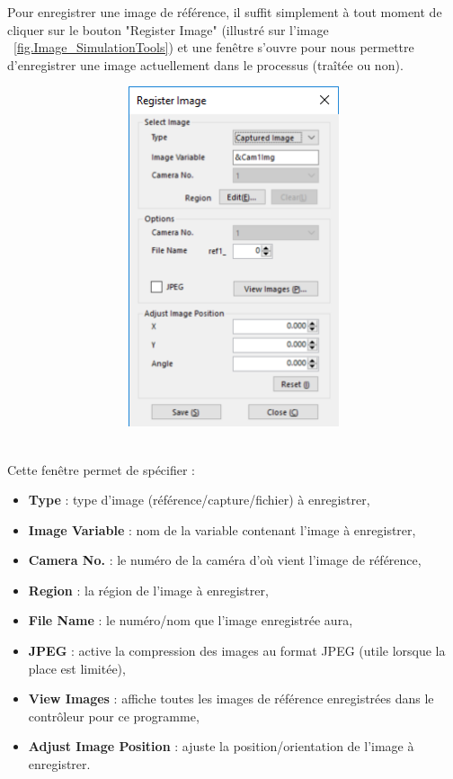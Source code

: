 Pour enregistrer une image de référence, il suffit simplement à tout moment de cliquer sur le bouton "Register Image" (illustré sur l'image ~\ref{fig.Image_SimulationTools}) et une fenêtre s’ouvre pour nous permettre d’enregistrer une image actuellement dans le processus (traîtée ou non). 

\noindent
\begin{minipage}[c]{\textwidth}
  \centering
  \includegraphics[width=16cm, height=10cm, keepaspectratio]{addOns/registerImage.png}
  \label{fig.Image_RefImagesSaves}
\end{minipage}\\

Cette fenêtre permet de spécifier :
\begin{itemize}
  \item \textbf{Type} : type d’image (référence/capture/fichier) à enregistrer,
  \item \textbf{Image Variable} : nom de la variable contenant l’image à enregistrer,
  \item \textbf{Camera No.} : le numéro de la caméra d’où vient l’image de référence,
  \item \textbf{Region} : la région de l’image à enregistrer,
  \item \textbf{File Name} : le numéro/nom que l’image enregistrée aura,
  \item \textbf{JPEG} : active la compression des images au format JPEG (utile lorsque la place est limitée),
  \item \textbf{View Images} : affiche toutes les images de référence enregistrées dans le contrôleur pour ce programme,
  \item \textbf{Adjust Image Position} : ajuste la position/orientation de l’image à enregistrer.

\end{itemize}
